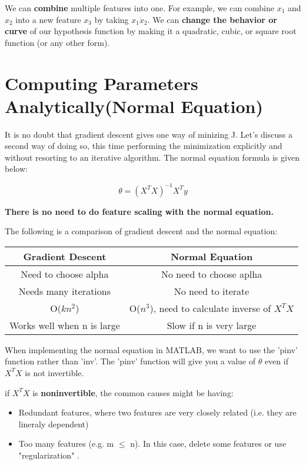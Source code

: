 \documentclass[11pt]{article}
\begin{document}
		We can \textbf{combine} multiple features into one. For example, we can combine $x_1$ and $x_2$ into a new feature $x_3$ by taking $x_1\dot x_2$. We can \textbf{change the behavior or curve} of our hypothesis function by making it a quadratic, cubic, or square root function (or any other form).
		

	\section{Computing Parameters Analytically(Normal Equation)}
	
		It is no doubt that gradient descent gives one way of minizing J. Let's discuss a second way of doing so, this time performing the minimization explicitly and without resorting to an iterative algorithm. The normal equation formula is given below:
		
		$$
		\theta = (X^{T}X)^{-1}X^{T}y
		$$
		
		\textbf{There is no need to do feature scaling with the normal equation.}
		
		The following is a comparison of gradient descent and the normal equation:
		
		\begin{tabular}{| c | c |}
			\hline
			\textbf{Gradient Descent} & \textbf{Normal Equation} \\
			\hline
			Need to choose alpha & No need to choose aplha \\
			\hline
			Needs many iterations & No need to iterate \\
			\hline
			O($kn^2$) & O($n^3$), need to calculate inverse of $X^{T}X$ \\
			\hline 
			Works well when n is large & Slow if n is very large \\
			\hline
		\end{tabular}
		
		When implementing the normal equation in MATLAB, we want to use the 'pinv' function rather than 'inv'. The 'pinv' function will give you a value of $\theta$ even if $X^{T}X$ is not invertible.
		
		if $X^{T}X$ is \textbf{noninvertible}, the common causes might be having:
		
		\begin{itemize}
		\item Redundant features, where two features are very closely related (i.e. they are lineraly dependent)
		\item Too many features (e.g. m $\leq$ n). In this case, delete some features or use "regularization" .
		\end{itemize}
		
\end{document}
